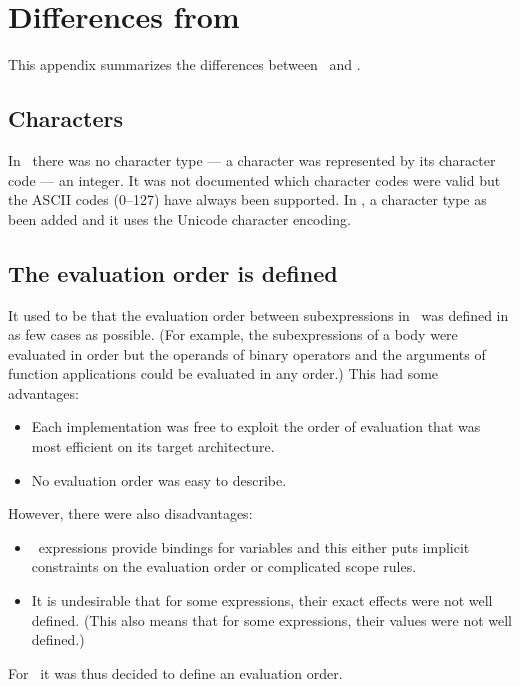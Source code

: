 %
%
%
%
%
%
%

\chapter{Differences from \OldVersion}

This appendix summarizes the differences between \OldVersion\ and \NewVersion.

\section{Characters}

In \OldVersion\ there was no character type --- a character was represented
by its character code --- an integer.  It was not documented which
character codes were valid but the ASCII codes (0--127) have always been supported.
In \NewVersion, a character type as been added and it uses the Unicode
character encoding.

\section{The evaluation order is defined}

\label{section:new-evaluation-order}

It used to be that the evaluation order between subexpressions in
\Erlang\ was defined in as few cases as possible.  (For example, the
subexpressions of a body were evaluated in order but the operands of
binary operators and the arguments of function applications could be
evaluated in any order.)
This had some advantages:
\begin{itemize}
\item Each implementation was free to exploit the order of evaluation
that was most efficient on its target architecture.
\item No evaluation order was easy to describe.
\end{itemize}
However, there were also disadvantages:
\begin{itemize}
\item \Erlang\ expressions provide bindings for variables and this either
puts implicit constraints on the evaluation order or complicated
scope rules.
\item It is undesirable that for some expressions, their exact effects were not
well defined.  (This also means that for some expressions, their values were
not well defined.)
\end{itemize}
For \NewVersion\ it was thus decided to define an evaluation order.

